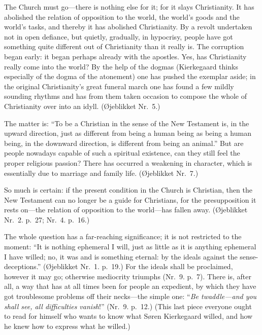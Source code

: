 \documentclass[12pt,a4paper]{book}
\newcommand{\opage}[1]{\marginnote{\footnotesize\textit{[#1]}}}
\begin{document}
The Church must go---there is nothing else for it; for it slays
Christianity. It has abolished the relation of opposition to the world,
the world's goods and the world's tasks, and thereby it has abolished
Christianity. By a revolt undertaken not in open defiance, but quietly,
gradually, in hypocrisy, people have got something quite different out of
Christianity than it really is. The corruption began early: it began
perhaps already with the apostles. Yes, has Christianity really come into
the world? By the help of the dogmas (Kierkegaard thinks especially of
the dogma of the atonement) one has pushed the exemplar aside; in the
original Christianity's great funeral march one has found a few mildly
sounding rhythms and has from them taken occasion to compose the whole of
Christianity over into an idyll. (Øjeblikket Nr.~5.)

The matter is: ``To be a Christian in the sense of the New Testament is,
in the upward direction, just as different from being a human being as
being a human being, in the downward direction, is different from being
an animal.''
\opage{148}But are people nowadays capable of such a spiritual existence,
can they still feel the proper religious passion? There has occurred a
weakening in character, which is essentially due to marriage and family
life. (Øjeblikket Nr.~7.)

So much is certain: if the present condition in the Church is Christian,
then the New Testament can no longer be a guide for Christians, for the
presupposition it rests on---the relation of opposition to the
world---has fallen away. (Øjeblikket Nr.~2. p.~27; Nr.~4. p.~16.)

The whole question has a far-reaching significance; it is not restricted
to the moment: ``It is nothing ephemeral I will, just as little as it is
anything ephemeral I have willed; no, it was and is something eternal: by
the ideals against the sense-deceptions.'' (Øjeblikket Nr.~1. p.~19.) For
the ideals shall be proclaimed, however it may go; otherwise mediocrity
triumphs (Nr.~9. p.~7). There is, after all, a way that has at all times
been for people an expedient, by which they have got troublesome
problems off their necks---the simple one: ``\textit{Be twaddle---and you
shall see, all difficulties vanish}!'' (Nr.~9. p.~12.) (This last piece
everyone ought to read for himself who wants to know what Søren
Kierkegaard willed, and how he knew how to express what he willed.)
\end{document}
